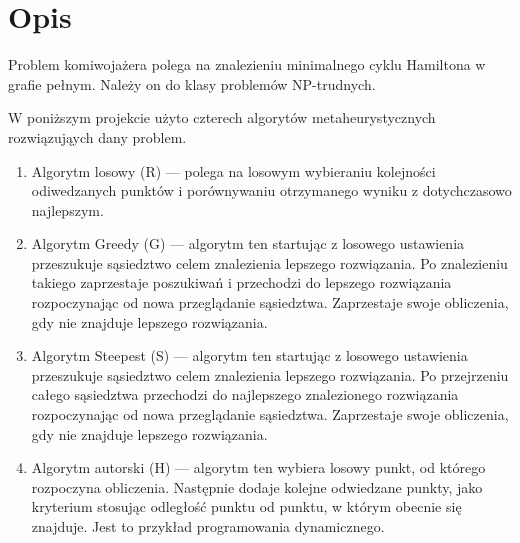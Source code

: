 \section{Opis}

Problem komiwojażera polega na znalezieniu minimalnego cyklu Hamiltona
w grafie pełnym. Należy on do klasy problemów NP-trudnych. 

W poniższym projekcie użyto czterech algorytów metaheurystycznych rozwiązująych 
dany problem. 

\begin{enumerate}

\item Algorytm losowy (R) --- polega na losowym wybieraniu kolejności odiwedzanych punktów i 
porównywaniu otrzymanego wyniku z dotychczasowo najlepszym.

\item Algorytm Greedy (G) --- algorytm ten startując z losowego ustawienia przeszukuje 
sąsiedztwo celem znalezienia lepszego rozwiązania. Po znalezieniu takiego zaprzestaje 
poszukiwań i przechodzi do lepszego rozwiązania rozpoczynając od nowa przeglądanie sąsiedztwa.
Zaprzestaje swoje obliczenia, gdy nie znajduje lepszego rozwiązania.

\item Algorytm Steepest (S) --- algorytm ten startując z losowego ustawienia przeszukuje 
sąsiedztwo celem znalezienia lepszego rozwiązania. Po przejrzeniu całego sąsiedztwa przechodzi 
do najlepszego znalezionego rozwiązania rozpoczynając od nowa przeglądanie sąsiedztwa.
Zaprzestaje swoje obliczenia, gdy nie znajduje lepszego rozwiązania.

\item Algorytm autorski (H) --- algorytm ten wybiera losowy punkt, od którego rozpoczyna obliczenia.
Następnie dodaje kolejne odwiedzane punkty, jako kryterium stosując odległość punktu od punktu, w 
którym obecnie się znajduje. Jest to przykład programowania dynamicznego.

\end{enumerate}

